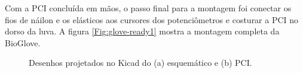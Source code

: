 \documentclass[
	12pt,				%
	openright,			%
	oneside,			%
	a4paper,			%
	english,			%
	brazil				%
	]{abntex2}
\begin{document}
		Com a PCI concluída em mãos, o passo final para a montagem foi conectar os fios de náilon e os elásticos aos cursores dos potenciômetros e costurar a PCI no dorso da luva. A figura \ref{Fig:glove-ready1} mostra a montagem completa da BioGlove.

	\begin{figure}[!htb]
		 \centering
		 \caption{ Desenhos projetados no Kicad do (a) esquemático e (b) PCI. }
		 \centering
		 \label{Fig:schematic-and-PCB}
	\end{figure}
\end{document}
